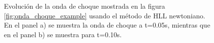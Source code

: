 \documentclass[12pt,a4paper]{book}
\begin{document}
\begin{figure}[H]
\centering
{}
\caption{Evolución de la onda de choque mostrada en la figura \ref{fig:onda_choque_example} usando el método de HLL newtoniano. En el panel a) se muestra la onda de choque a t=0.05s, mientras que en el panel b) se muestra para t=0.10s.} \label{fig:HLL-prueba1}
\end{figure}
\end{document}
